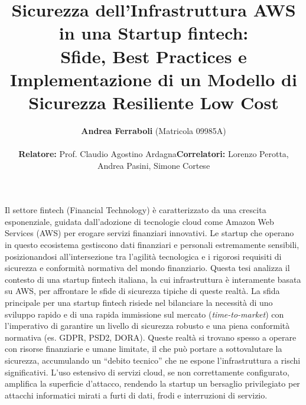 \documentclass[a4paper,12pt]{article}
\title{\large{Sicurezza dell'Infrastruttura AWS in una Startup fintech:}\\ \large{Sfide, Best Practices e Implementazione di un Modello di Sicurezza Resiliente Low Cost}}
\author{\textbf{Andrea Ferraboli} \small (Matricola 09985A) \\[1em] 
\begin{tabular*}{\textwidth}{@{}l@{\extracolsep{\fill}}r@{}}
{\small\textbf{Relatore:}} \small Prof. Claudio Agostino Ardagna & {\small\textbf{Correlatori:}} \small Lorenzo Perotta, \\
& \small Andrea Pasini, \small Simone Cortese
\end{tabular*}}
\date{}
\begin{document}
\maketitle

\noindent
Il settore fintech (Financial Technology) è caratterizzato da una crescita esponenziale, guidata dall'adozione di tecnologie cloud come Amazon Web Services (AWS) per erogare servizi finanziari innovativi. Le startup che operano in questo ecosistema gestiscono dati finanziari e personali estremamente sensibili, posizionandosi all'intersezione tra l'agilità tecnologica e i rigorosi requisiti di sicurezza e conformità normativa del mondo finanziario. Questa tesi analizza il contesto di una startup fintech italiana, la cui infrastruttura è interamente basata su AWS, per affrontare le sfide di sicurezza tipiche di queste realtà.
\noindent
La sfida principale per una startup fintech risiede nel bilanciare la necessità di uno sviluppo rapido e di una rapida immissione sul mercato (\textit{time-to-market}) con l'imperativo di garantire un livello di sicurezza robusto e una piena conformità normativa (es. GDPR, PSD2, DORA). Queste realtà si trovano spesso a operare con risorse finanziarie e umane limitate, il che può portare a sottovalutare la sicurezza, accumulando un ``debito tecnico'' che ne espone l'infrastruttura a rischi significativi. L'uso estensivo di servizi cloud, se non correttamente configurato, amplifica la superficie d'attacco, rendendo la startup un bersaglio privilegiato per attacchi informatici mirati a furti di dati, frodi e interruzioni di servizio.
\end{document}
